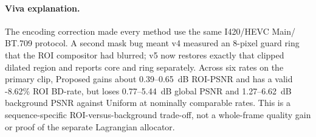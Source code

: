 \documentclass[11pt,a4paper]{article}
\begin{document}
\paragraph{Viva explanation.}
The encoding correction made every method use the same I420/HEVC Main/
BT.709 protocol. A second mask bug meant v4 measured an 8-pixel guard ring
that the ROI compositor had blurred; v5 now restores exactly that clipped
dilated region and reports core and ring separately. Across six rates on the
primary clip, Proposed gains about 0.39--0.65~dB ROI-PSNR and has a valid
-8.62\% ROI BD-rate, but loses 0.77--5.44~dB global PSNR and
1.27--6.62~dB background PSNR against Uniform at nominally comparable rates.
This is a sequence-specific ROI-versus-background trade-off, not a
whole-frame quality gain or proof of the separate Lagrangian allocator.
\end{document}
